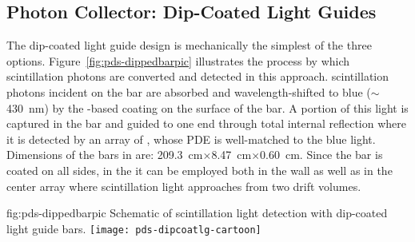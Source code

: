 
\subsection{Photon Collector: Dip-Coated Light Guides}
\label{ssec:fdsp-pd-pc-bar1}


The dip-coated light guide design is mechanically the simplest of the three options. Figure~\ref{fig:pds-dippedbarpic} illustrates the process by which \lar scintillation photons are converted and detected in this approach.   scintillation photons incident on the bar are absorbed and wavelength-shifted to blue ($\sim$\SI{430}{nm}) by the -based coating on the surface of the bar.  A portion of this light is captured in the bar and guided to one end through total internal reflection where it is detected by an array of , whose PDE is well-matched to the blue light.  Dimensions of the bars in  are: \SI{209.3}{cm}$\times$\SI{8.47}{cm}$\times$\SI{0.60}{cm}.
Since the bar is coated on all sides, in the  it can be employed both in the wall  as well as in the center  array where scintillation light approaches from two drift volumes.

\begin{dunefigure}{fig:pds-dippedbarpic}
{Schematic of scintillation light detection with dip-coated light guide bars.}
  \texttt{[image: pds-dipcoatlg-cartoon]}
\end{dunefigure}


